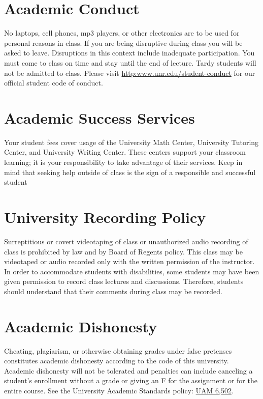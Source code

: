 \documentclass[11pt,onecolumn]{article}
\begin{document}
\section*{Academic Conduct}
No laptops, cell phones, mp3 players, or other electronics are to be used for personal reasons in class. If you are being disruptive during class you will be asked to leave. Disruptions in this context include inadequate participation. You must come to class on time and stay until the end of lecture. Tardy students will not be admitted to class. Please visit \url{http:www.unr.edu/student-conduct} for our official student code of conduct.

\section*{Academic Success Services}
Your student fees cover usage of the University Math Center, University Tutoring Center, and University Writing Center. These centers support your classroom learning; it is your responsibility to take advantage of their services. Keep in mind that seeking help outside of class is the sign of a responsible and successful student

\section*{University Recording Policy}
Surreptitious or covert videotaping of class or unauthorized audio recording of class is prohibited by law and by Board of Regents policy. This class may be videotaped or audio recorded only with the written permission of the instructor. In order to accommodate students with disabilities, some students may have been given permission to record class lectures and discussions. Therefore, students should understand that their comments during class may be recorded.

\section*{Academic Dishonesty}
Cheating, plagiarism, or otherwise obtaining grades under false pretenses constitutes academic dishonesty according to the code of this university. Academic dishonesty will not be tolerated and penalties can include canceling a student’s enrollment without a grade or giving an F for the assignment or for the entire course. See the University Academic Standards policy: \href{https://www.unr.edu/administrative-manual/6000-6999-curricula-teaching-research/instruction-research-procedures/6502-academic-standards}{UAM 6,502}.
\end{document}
